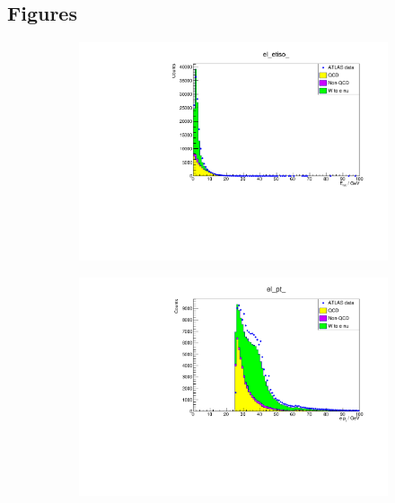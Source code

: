 \documentclass[11pt,a4paper,notitlepage]{scrartcl}
\begin{document}
\subsection*{Figures}
\begin{figure}[H]
	\centering
	\begin{subfigure}{0.49\linewidth}
		\includegraphics[width=\linewidth]{P1_pics/cuts/el_etiso_qcd_eyeball.pdf}
		\caption{}
	\end{subfigure}
	\begin{subfigure}{0.49\linewidth}
		\includegraphics[width=\linewidth]{P1_pics/cuts/el_pt_qcd_eyeball.pdf}
		\caption{}
	\end{subfigure}
	\begin{subfigure}{0.49\linewidth}

\end{subfigure}
\end{figure}
\end{document}
